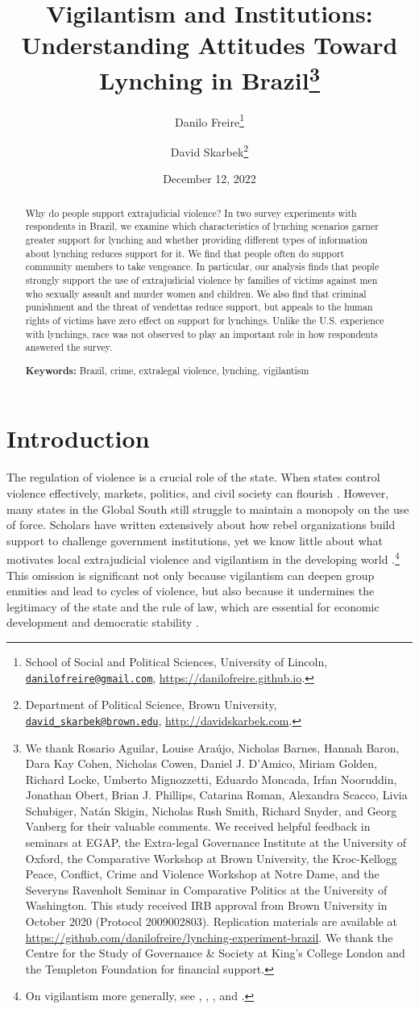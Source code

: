 \documentclass[12pt,a4paper]{article}
\title{Vigilantism and Institutions:\\ Understanding Attitudes Toward Lynching in Brazil\footnote{We thank Rosario Aguilar, Louise Araújo, Nicholas Barnes, Hannah Baron, Dara Kay Cohen, Nicholas Cowen, Daniel J. D'Amico, Miriam Golden, Richard Locke, Umberto Mignozzetti, Eduardo Moncada, Irfan Nooruddin, Jonathan Obert, Brian J. Phillips, Catarina Roman, Alexandra Scacco, Livia Schubiger, Natán Skigin, Nicholas Rush Smith, Richard Snyder, and Georg Vanberg for their valuable comments. We received helpful feedback in seminars at EGAP, the Extra-legal Governance Institute at the University of Oxford, the Comparative Workshop at Brown University, the Kroc-Kellogg Peace, Conflict, Crime and Violence Workshop at Notre Dame, and the Severyns Ravenholt Seminar in Comparative Politics at the University of Washington. This study received IRB approval from Brown University in October 2020 (Protocol 2009002803). Replication materials are available at \url{https://github.com/danilofreire/lynching-experiment-brazil}. We thank the Centre for the Study of Governance \& Society at King's College London and the Templeton Foundation for financial support.}}
\author{Danilo Freire\footnote{School of Social and Political Sciences, University of Lincoln, \href{mailto:danilofreire@gmail.com}{\texttt{danilofreire@gmail.com}}, \url{https://danilofreire.github.io}.} \and David Skarbek\footnote{Department of Political Science, Brown University, \href{mailto:david_skarbek@brown.edu}{\texttt{david\_skarbek@brown.edu}}, \url{http://davidskarbek.com}.}}
\date{December 12, 2022}
\begin{document}
\maketitle

\begin{abstract}
\doublespacing \noindent Why do people support extrajudicial violence? In two survey experiments with respondents in Brazil, we examine which characteristics of lynching scenarios garner greater support for lynching and whether providing different types of information about lynching reduces support for it. We find that people often do support community members to take vengeance. In particular, our analysis finds that people strongly support the use of extrajudicial violence by families of victims against men who sexually assault and murder women and children. We also find that criminal punishment and the threat of vendettas reduce support, but appeals to the human rights of victims have zero effect on support for lynchings. Unlike the U.S. experience with lynchings, race was not observed to play an important role in how respondents answered the survey.
\vspace{.25cm}

\noindent \textbf{Keywords:} Brazil, crime, extralegal violence, lynching, vigilantism
\vspace{.25cm}

\end{abstract}

\newpage

\section*{Introduction}
\label{sec:introduction}

\doublespacing

The regulation of violence is a crucial role of the state. When states control
violence effectively, markets, politics, and civil society can flourish
\citep{besley2011pillars, north2009violence}. However, many states in the
Global South still struggle to maintain a monopoly on the use of force.
Scholars have written extensively about how rebel organizations build support
to challenge government institutions, yet we know little about what motivates
local extrajudicial violence and vigilantism in the developing world
\citep{bateson2020politics}.\footnote{On vigilantism more generally, see
\citet{cohen2022collective}, \citet{schuberth2013challenging},
\citet{smith2019contradictions}, and \citet{zizumbo2017community}.} This
omission is significant not only because vigilantism can deepen group enmities
and lead to cycles of violence, but also because it undermines the legitimacy
of the state and the rule of law, which are essential for economic development
and democratic stability \citep{jung2020lynching, tankebe2009self}.
\end{document}
